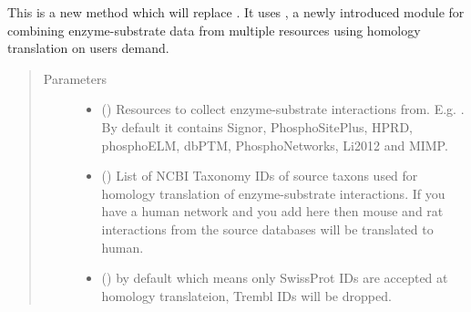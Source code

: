 \documentclass[letterpaper,10pt,english]{sphinxmanual}
\begin{document}
\begin{fulllineitems}
\begin{fulllineitems}
\label{\detokenize{reference:pypath.main.PyPath.load_ptms}}
\end{fulllineitems}


\begin{fulllineitems}
\label{\detokenize{reference:pypath.main.PyPath.load_ptms2}}
This is a new method which will replace .
It uses , a newly introduced
module for combining enzyme-substrate data from multiple
resources using homology translation on users demand.
\begin{quote}\begin{description}
\item[{Parameters}] \leavevmode\begin{itemize}
\item {} 
 () \textendash{} Resources to collect enzyme-substrate
interactions from. E.g. . By default
it contains Signor, PhosphoSitePlus, HPRD, phosphoELM, dbPTM,
PhosphoNetworks, Li2012 and MIMP.

\item {} 
 () \textendash{} List of NCBI Taxonomy IDs of
source taxons used for homology translation of enzyme-substrate
interactions. If you have a human network and you add here
\sphinxtitleref{{[}10090, 10116{]}} then mouse and rat interactions from the source
databases will be translated to human.

\item {} 
 () \textendash{}  by default which means
only SwissProt IDs are accepted at homology translateion, Trembl
IDs will be dropped.


\end{itemize}
\end{description}
\end{quote}
\end{fulllineitems}
\end{fulllineitems}
\end{document}
